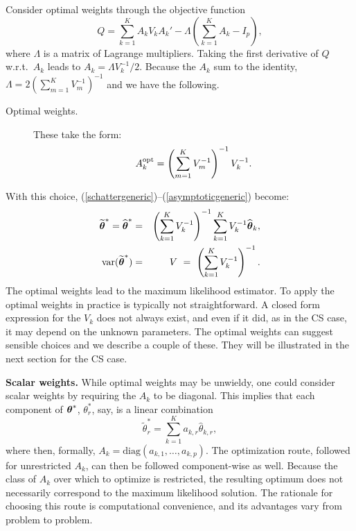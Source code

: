 \documentclass[11pt,a5paper,twoside]{book}
\newcommand{\bftheta}{\mbox{\boldmath $\theta$}}
\begin{document}
Consider optimal weights through the objective function
$$Q=\sum_{k=1}^KA_kV_kA_k'-\Lambda\left(\sum_{k=1}^KA_k-I_p\right),$$
where $\Lambda$ is a matrix of Lagrange multipliers.
Taking the first derivative of $Q$ w.r.t.\ $A_k$ leads 
to $A_k=\Lambda V_k^{-1}/2$. Because the $A_k$ sum to the 
identity,  $\Lambda=2\left(\sum_{m=1}^KV_m^{-1}\right)^{-1}$ 
and we have the following.
\begin{description}
  \item[Optimal weights.] These take the form:
\begin{equation}
\label{optimalwt}
A_k^{\mbox{\scriptsize opt}}=\left(\sum_{m=1}^KV_m^{-1}\right)^{-1}V_k^{-1}.
\end{equation}
\end{description}
With this choice, (\ref{schattergeneric})--(\ref{asymptoticgeneric}) become:
\begin{eqnarray}
\label{schatteropt}
\widetilde{\bftheta}^*=\widehat{\bftheta}^*&=&
\left(\sum_{k=1}^KV_k^{-1}\right)^{-1}
\sum_{k=1}^KV_k^{-1}\widehat{\bftheta}_k
,\\
\mbox{var}(\widetilde{\bftheta}^*)&=&V\ =\ \left(\sum_{k=1}^KV_k^{-1}\right)^{-1}.
\label{asymptoticopt}
\end{eqnarray}
The optimal weights lead to the maximum likelihood estimator. To apply the 
optimal weights in practice is typically not straightforward. A closed form expression for the $V_k$ does not always exist, and even if it did, as in the CS case, it may depend on the 
unknown parameters. The optimal weights can suggest 
sensible choices and we describe a couple of these. They will be illustrated 
in the next section for the CS case.

{\bfseries Scalar weights.} While optimal weights 
may be unwieldy, one could consider scalar weights by requiring the $A_k$ 
to be diagonal. This implies that each component of 
$\bftheta^\ast$, $\theta_r^\ast$, say, is a linear combination
$$\widetilde{\theta}_r^\ast=\sum_{k=1}^Ka_{k,r}\widehat{\theta}_{k,r},$$
where then, formally, $A_k=\mbox{diag}(a_{k,1},\dots,a_{k,p})$. 
The optimization route, followed for unrestricted $A_k$, can then 
be followed component-wise as well. Because the class of 
$A_k$ over which to optimize is restricted, the resulting optimum 
does not necessarily correspond to the maximum likelihood solution. 
The rationale for choosing this route is computational convenience, and its advantages  
vary from problem to problem. 
\end{document}
